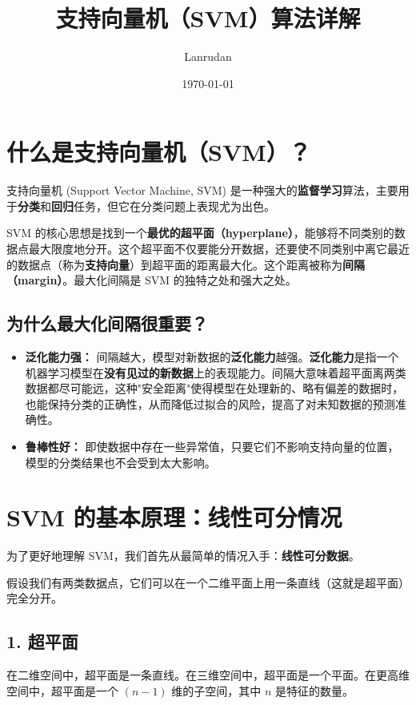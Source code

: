 \documentclass{article}
\title{支持向量机（SVM）算法详解}
\author{Lanrudan}
\date{\today}
\begin{document}
\maketitle



\section*{什么是支持向量机（SVM）？}
支持向量机 (Support Vector Machine, SVM) 是一种强大的\textbf{监督学习}算法，主要用于\textbf{分类}和\textbf{回归}任务，但它在分类问题上表现尤为出色。

SVM 的核心思想是找到一个\textbf{最优的超平面（hyperplane）}，能够将不同类别的数据点最大限度地分开。这个超平面不仅要能分开数据，还要使不同类别中离它最近的数据点（称为\textbf{支持向量}）到超平面的距离最大化。这个距离被称为\textbf{间隔（margin）}。最大化间隔是 SVM 的独特之处和强大之处。

\subsection*{为什么最大化间隔很重要？}
\begin{itemize}
    \item \textbf{泛化能力强：} 间隔越大，模型对新数据的\textbf{泛化能力}越强。\textbf{泛化能力}是指一个机器学习模型在\textbf{没有见过的新数据}上的表现能力。间隔大意味着超平面离两类数据都尽可能远，这种"安全距离"使得模型在处理新的、略有偏差的数据时，也能保持分类的正确性，从而降低过拟合的风险，提高了对未知数据的预测准确性。
    \item \textbf{鲁棒性好：} 即使数据中存在一些异常值，只要它们不影响支持向量的位置，模型的分类结果也不会受到太大影响。
\end{itemize}



\section*{SVM 的基本原理：线性可分情况}
为了更好地理解 SVM，我们首先从最简单的情况入手：\textbf{线性可分数据}。

假设我们有两类数据点，它们可以在一个二维平面上用一条直线（这就是超平面）完全分开。

\subsection*{1. 超平面}
在二维空间中，超平面是一条直线。在三维空间中，超平面是一个平面。在更高维空间中，超平面是一个 $(n-1)$ 维的子空间，其中 $n$ 是特征的数量。
\end{document}
